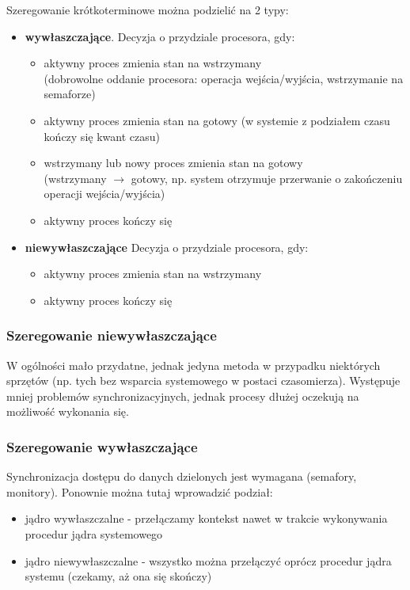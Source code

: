     Szeregowanie krótkoterminowe można podzielić na 2 typy:
    \begin{itemize}
        \item \textbf{wywłaszczające}. Decyzja o przydziale procesora, gdy:
            \begin{itemize}
                \item aktywny proces zmienia stan na wstrzymany 
                \\ (dobrowolne oddanie procesora: operacja wejścia/wyjścia, wstrzymanie na semaforze)
                \item aktywny proces zmienia stan na gotowy (w systemie z podziałem czasu kończy się kwant czasu)
                \item wstrzymany lub nowy proces zmienia stan na gotowy
                \\ (wstrzymany $\rightarrow$ gotowy, np. system otrzymuje przerwanie o zakończeniu operacji wejścia/wyjścia)
                \item aktywny proces kończy się 
            \end{itemize}
        \item \textbf{niewywłaszczające} Decyzja o przydziale procesora, gdy:
            \begin{itemize}
                \item aktywny proces zmienia stan na wstrzymany
                \item aktywny proces kończy się 
            \end{itemize}
    \end{itemize}

    \subsubsection{Szeregowanie niewywłaszczające}
        W ogólności mało przydatne, jednak jedyna metoda w przypadku niektórych sprzętów (np. tych bez wsparcia systemowego w postaci czasomierza). Występuje mniej problemów synchronizacyjnych, jednak procesy dłużej oczekują na możliwość wykonania się.
    \subsubsection{Szeregowanie wywłaszczające}
        Synchronizacja dostępu do danych dzielonych jest wymagana (semafory, monitory). Ponownie można tutaj wprowadzić podział:
        \begin{itemize}
            \item jądro wywłaszczalne - przełączamy kontekst nawet w trakcie wykonywania procedur jądra systemowego
            \item jądro niewywłaszczalne - wszystko można przełączyć oprócz procedur jądra systemu (czekamy, aż ona się skończy)
        \end{itemize} 
